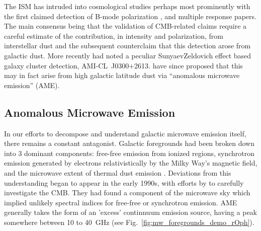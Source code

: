     The ISM has intruded into cosmological studies perhaps most prominently with the first claimed detection of B-mode polarization \citep{hanson13, bicep214, flauger14}, and multiple response papers. The main consensus being that the validation of CMB-related claims require a careful estimate of the contribution, in intensity and polarization, from interstellar dust and the subsequent counter\-claim that this detection arose from galactic dust\citep{planckIntL17, sheehy17}. More recently \cite{shimwell12} had noted a peculiar Sunyaev\-Zeldovich effect based galaxy cluster detection, AMI-CL~J0300+2613. \cite{perrott18} have since proposed that this may in fact arise from high galactic latitude dust via ``anomalous microwave emission'' (AME).

  \subsection{Anomalous Microwave Emission}
      In our efforts to decompose and understand galactic microwave emission itself, there remains a constant antagonist. Galactic foregrounds had been broken down into 3 dominant components: free-free emission from ionized regions, synchrotron emission generated by electrons relativistically by the Milky Way's magnetic field, and the microwave extent of thermal dust emission \citep{wmap03b, leach08, planckXII}. Deviations from this understanding began to appear in the early 1990s, with efforts by \cite{kogut96, leitch97} to carefully investigate the CMB. They had found a component of the microwave sky which implied unlikely spectral indices for free-free or synchrotron emission. AME generally takes the form of an 'excess' continnuum emission source, having a peak somewhere between 10 to 40~GHz (see Fig.~\ref{fig:mw_foregrounds_demo_rOph}).

